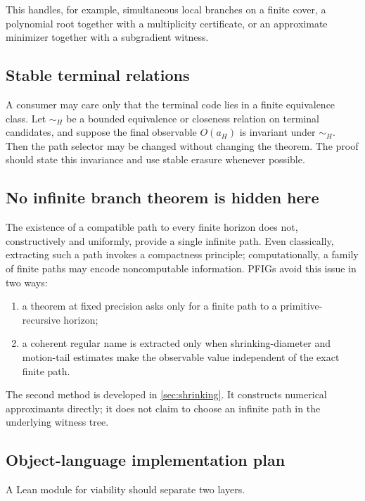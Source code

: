 This handles, for example, simultaneous local branches on a finite cover, a polynomial root together with a multiplicity certificate, or an approximate minimizer together with a subgradient witness.

\subsection{Stable terminal relations}

A consumer may care only that the terminal code lies in a finite equivalence class.  Let \(\sim_H\) be a bounded equivalence or closeness relation on terminal candidates, and suppose the final observable \(O(a_H)\) is invariant under \(\sim_H\).  Then the path selector may be changed without changing the theorem.  The proof should state this invariance and use stable erasure whenever possible.

\subsection{No infinite branch theorem is hidden here}

The existence of a compatible path to every finite horizon does not, constructively and uniformly, provide a single infinite path.  Even classically, extracting such a path invokes a compactness principle; computationally, a family of finite paths may encode noncomputable information.  PFIGs avoid this issue in two ways:

\begin{enumerate}
\item a theorem at fixed precision asks only for a finite path to a primitive-recursive horizon;
\item a coherent regular name is extracted only when shrinking-diameter and motion-tail estimates make the observable value independent of the exact finite path.
\end{enumerate}

The second method is developed in \cref{sec:shrinking}.  It constructs numerical approximants directly; it does not claim to choose an infinite path in the underlying witness tree.

\subsection{Object-language implementation plan}

A Lean module for viability should separate two layers.

